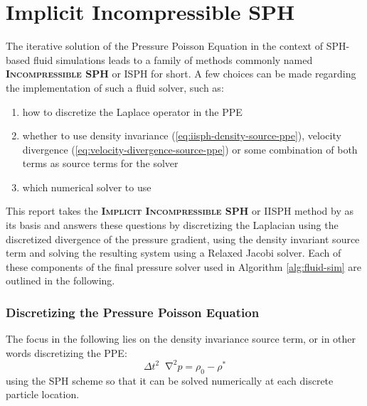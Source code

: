 \documentclass[oneside, a4paper]{book}
\newcommand\emphasis[1]{{\scshape\bfseries#1}}
\newcommand*\Laplace{\mathop{}\!\mathbin\nabla^2}
\begin{document}
    \section{Implicit Incompressible SPH}
    The iterative solution of the Pressure Poisson Equation in the context of SPH-based fluid simulations leads to a family of methods commonly named \emphasis{Incompressible SPH} or ISPH for short. A few choices can be made regarding the implementation of such a fluid solver, such as:
    \begin{enumerate}
      \item how to discretize the Laplace operator in the PPE \autocite{fuerstenau-laplace-discretization-comparison}
      \item whether to use density invariance (\autoref{eq:iisph-density-source-ppe})\autocite{iisph}, velocity divergence (\autoref{eq:velocity-divergence-source-ppe}) or some combination of both terms \autocites{dfsph}{optimized-source-term} as source terms for the solver
      \item which numerical solver to use
    \end{enumerate}

    This report takes the \emphasis{Implicit Incompressible SPH} or IISPH method by \autocite[Ihmsen et al.]{iisph} as its basis and answers these questions by discretizing the Laplacian using the discretized divergence of the pressure gradient, using the density invariant source term and solving the resulting system using a Relaxed Jacobi solver. Each of these components of the final pressure solver used in Algorithm \ref{alg:fluid-sim} are outlined in the following.
    
    \subsubsection{Discretizing the Pressure Poisson Equation}\label{subsec:discretizing-the-ppe}
    The focus in the following lies on the density invariance source term, or in other words discretizing the PPE:
    \begin{equation}
      \Delta t^2 \Laplace p = \rho_0-\rho^*
    \end{equation}
    using the SPH scheme so that it can be solved numerically at each discrete particle location.
\end{document}
